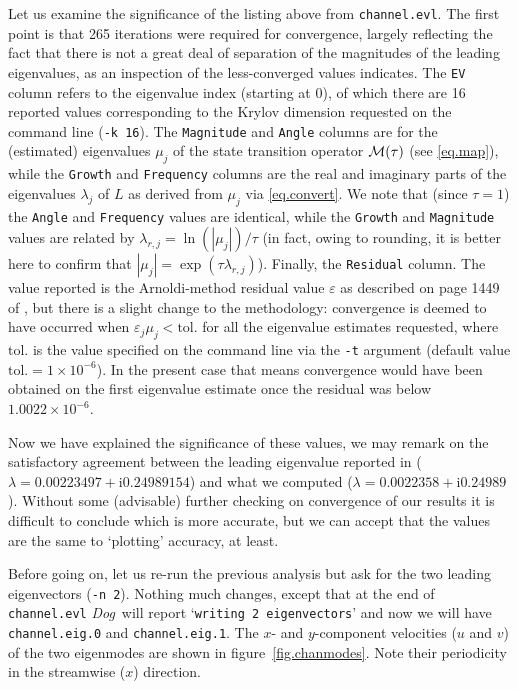 \documentclass[11pt,a4paper]{report}
\newcommand\ci{\mathrm{i}}
\newcommand\Lop{{L}}
\newcommand\Mop{{\cal M}}
\newcommand{\Dog}{\emph{Dog}}
\begin{document}
Let us examine the significance of the listing above from
\verb+channel.evl+.  The first point is that 265 iterations were
required for convergence, largely reflecting the fact that there is
not a great deal of separation of the magnitudes of the leading
eigenvalues, as an inspection of the less-converged values indicates.
The \verb+EV+ column refers to the eigenvalue index (starting at 0),
of which there are 16 reported values corresponding to the Krylov
dimension requested on the command line (\verb+-k 16+).  The
\verb+Magnitude+ and \verb+Angle+ columns are for the (estimated)
eigenvalues $\mu_j$ of the state transition operator $\Mop(\tau)$ (see
\ref{eq.map}), while the \verb+Growth+ and \verb+Frequency+ columns
are the real and imaginary parts of the eigenvalues $\lambda_j$ of
$\Lop$ as derived from $\mu_j$ via \eqref{eq.convert}.  We note that
(since $\tau=1$) the \verb+Angle+ and \verb+Frequency+ values are
identical, while the \verb+Growth+ and \verb+Magnitude+ values are
related by $\lambda_{r,j}=\ln(|\mu_j|)/\tau$ (in fact, owing to
rounding, it is better here to confirm that $|\mu_j| =
\exp(\tau\lambda_{r,j})$).  Finally, the \verb+Residual+ column.  The
value reported is the Arnoldi-method residual value $\varepsilon$ as
described on page 1449 of \citet{bbs08b}, but there is a slight change
to the methodology: convergence is deemed to have occurred when
$\varepsilon_j\mu_j<\textrm{tol.}$ for all the eigenvalue estimates
requested, where $\textrm{tol.}$ is the value specified on the command
line via the \verb+-t+ argument (default value
$\textrm{tol.}=1\times10^{-6}$). In the present case that means
convergence would have been obtained on the first eigenvalue estimate
once the residual was below $1.0022\times10^{-6}$.

Now we have explained the significance of these values, we may remark
on the satisfactory agreement between the leading eigenvalue reported
in \citet{chqz88} ($\lambda=0.00223497+\ci 0.24989154$) and what we
computed ($\lambda=0.0022358+\ci 0.24989$). Without some (advisable)
further checking on convergence of our results it is difficult to
conclude which is more accurate, but we can accept that the values are
the same to `plotting' accuracy, at least.

Before going on, let us re-run the previous analysis but ask for the
two leading eigenvectors (\verb+-n 2+).  Nothing much changes, except that
at the end of \verb+channel.evl+ \Dog\ will report `\texttt{writing 2
  eigenvectors}' and now we will have \verb+channel.eig.0+ and
\verb+channel.eig.1+. The $x$- and $y$-component velocities ($u$ and
$v$) of the two eigenmodes are shown in figure~\ref{fig.chanmodes}.
Note their periodicity in the streamwise ($x$) direction.
\end{document}
